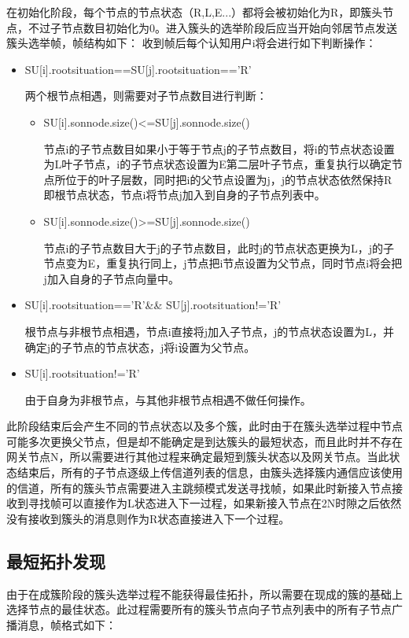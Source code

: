 \documentclass[a4paper,AutoFakeBold,oneside,12pt]{book}
\begin{document}
  在初始化阶段，每个节点的节点状态（R,L,E...）都将会被初始化为R，即簇头节点，不过子节点数目初始化为0。进入簇头的选举阶段后应当开始向邻居节点发送簇头选举帧，帧结构如下：
  收到帧后每个认知用户i将会进行如下判断操作：
\begin{itemize}
\item {SU[i].rootsituation==SU[j].rootsituation=='R'}

  两个根节点相遇，则需要对子节点数目进行判断：
\begin{itemize}
\item {SU[i].sonnode.size()<=SU[j].sonnode.size()}
  
  节点i的子节点数目如果小于等于节点j的子节点数目，将i的节点状态设置为L叶子节点，i的子节点状态设置为E第二层叶子节点，重复执行以确定节点所位于的叶子层数，同时把i的父节点设置为j，j的节点状态依然保持R即根节点状态，节点i将节点j加入到自身的子节点列表中。
\item {SU[i].sonnode.size()>=SU[j].sonnode.size()}

  节点i的子节点数目大于j的子节点数目，此时j的节点状态更换为L，j的子节点变为E，重复执行同上，j节点把i节点设置为父节点，同时节点i将会把j加入自身的子节点向量中。

\end{itemize}
\item {SU[i].rootsituation=='R'\&\& SU[j].rootsituation!='R'}
  
  根节点与非根节点相遇，节点i直接将j加入子节点，j的节点状态设置为L，并确定j的子节点的节点状态，j将i设置为父节点。
\item {SU[i].rootsituation!='R'}
  
  由于自身为非根节点，与其他非根节点相遇不做任何操作。
\end{itemize}

  此阶段结束后会产生不同的节点状态以及多个簇，此时由于在簇头选举过程中节点可能多次更换父节点，但是却不能确定是到达簇头的最短状态，而且此时并不存在网关节点N，所以需要进行其他过程来确定最短到簇头状态以及网关节点。当此状态结束后，所有的子节点逐级上传信道列表的信息，由簇头选择簇内通信应该使用的信道，所有的簇头节点需要进入主跳频模式发送寻找帧，如果此时新接入节点接收到寻找帧可以直接作为L状态进入下一过程，如果新接入节点在2N时隙之后依然没有接收到簇头的消息则作为R状态直接进入下一个过程。
  \subsection{最短拓扑发现}
  由于在成簇阶段的簇头选举过程不能获得最佳拓扑，所以需要在现成的簇的基础上选择节点的最佳状态。此过程需要所有的簇头节点向子节点列表中的所有子节点广播消息，帧格式如下：
\end{document}
